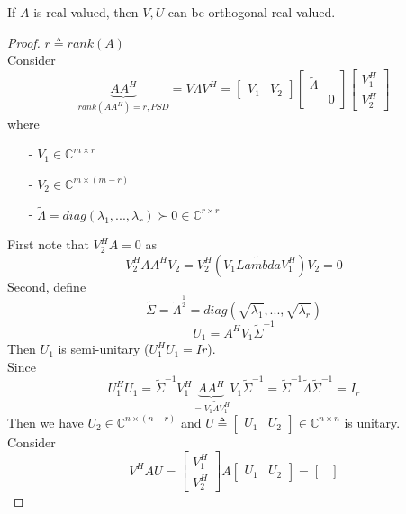 \begin{multicols}{2}
\begin{theorem}
    If $A$ is real-valued, then $V,U$ can be orthogonal real-valued.
\end{theorem}
\begin{proof}
    $r\triangleq rank(A)$\\
    Consider
    \[
        \underbrace{AA^H}_{rank(AA^H)=r, PSD} = V\Lambda V^H = \begin{bmatrix}
            V_1 & V_2
        \end{bmatrix}\begin{bmatrix}
            \tilde{\Lambda} & \\ & 0
        \end{bmatrix}\begin{bmatrix}
            V_1^H \\ V_2^H
        \end{bmatrix}
    \]
    where 
    \begin{itemize}
        \item [-] $V_1\in\mathbb{C}^{m\times r}$
        \item [-] $V_2\in\mathbb{C}^{m\times (m-r)}$
        \item [-] $\tilde{\Lambda} = diag(\lambda_1,...,\lambda_r)\succ 0 \in\mathbb{C}^{r\times r}$
    \end{itemize}
    First note that $V_2^HA=0$ as
    \[
        V_2^HAA^HV_2 = V_2^H(V_1\tilde{Lambda}V_1^H)V_2 = 0
    \]
    Second, define 
    \[
        \tilde{\Sigma}=\tilde{\Lambda}^{\frac{1}{2}}=diag(\sqrt{\lambda_1},...,\sqrt{\lambda_r})
    \]
    \[
        U_1 = A^HV_1\tilde{\Sigma}^{-1}
    \]
    Then $U_1$ is semi-unitary ($U_1^HU_1=Ir$). \\
    Since
    \[
        U_1^HU_1 = \tilde{\Sigma}^{-1}V_1^H\underbrace{AA^H}_{=V_1\tilde{\Lambda}V_1^H}V_1\tilde{\Sigma}^{-1} = \tilde{\Sigma}^{-1}\tilde{\Lambda}\tilde{\Sigma}^{-1} = I_r
    \]
    Then we have $U_2\in\mathbb{C}^{n\times (n-r)}$ and 
    $
        U\triangleq \begin{bmatrix}
            U_1 & U_2
        \end{bmatrix}\in\mathbb{C}^{n\times n}
    $ is unitary. \\
    Consider 
    \[
        V^HAU = \begin{bmatrix}
            V_1^H \\ V_2^H
        \end{bmatrix} A 
        \begin{bmatrix}
            U_1 & U_2
        \end{bmatrix} = \begin{bmatrix}

\end{bmatrix}\]
\end{proof}
\end{multicols}

